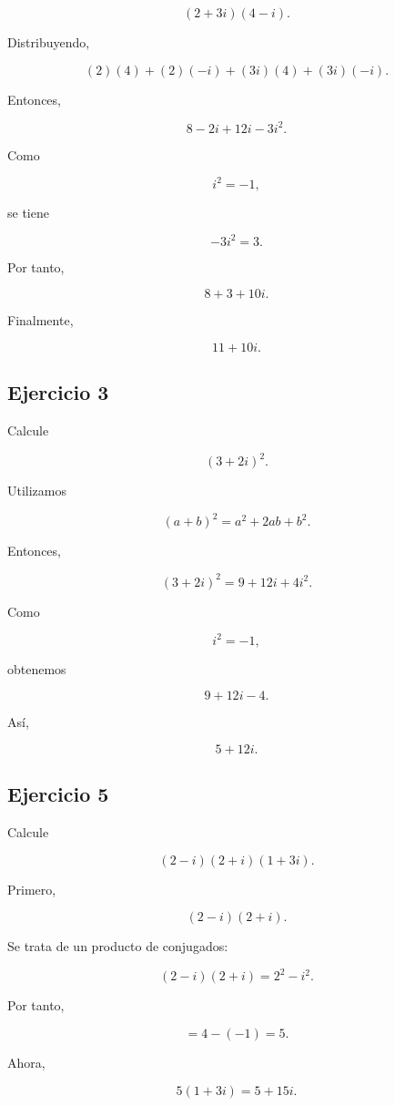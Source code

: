 \documentclass[12pt]{article}
\begin{document}
\[
(2+3i)(4-i).
\]

Distribuyendo,

\[
(2)(4)+(2)(-i)+(3i)(4)+(3i)(-i).
\]

Entonces,

\[
8-2i+12i-3i^2.
\]

Como

\[
i^2=-1,
\]

se tiene

\[
-3i^2=3.
\]

Por tanto,

\[
8+3+10i.
\]

Finalmente,

\[
\boxed{11+10i}.
\]


\subsection*{Ejercicio 3}

Calcule

\[
(3+2i)^2.
\]

Utilizamos

\[
(a+b)^2=a^2+2ab+b^2.
\]

Entonces,

\[
(3+2i)^2
=
9+12i+4i^2.
\]

Como

\[
i^2=-1,
\]

obtenemos

\[
9+12i-4.
\]

Así,

\[
\boxed{5+12i}.
\]


\subsection*{Ejercicio 5}

Calcule

\[
(2-i)(2+i)(1+3i).
\]

Primero,

\[
(2-i)(2+i).
\]

Se trata de un producto de conjugados:

\[
(2-i)(2+i)
=
2^2-i^2.
\]

Por tanto,

\[
=4-(-1)=5.
\]

Ahora,

\[
5(1+3i)=5+15i.
\]
\end{document}
